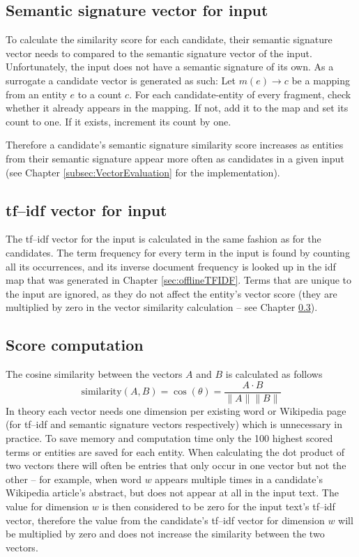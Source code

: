 \documentclass[runningheads,a4paper]{llncs}
\begin{document}
{\subsection{Semantic signature vector for input}\label{subsection:semSigVector}
To calculate the similarity score for each candidate, their semantic signature vector needs to compared to the semantic signature vector of the input. Unfortunately, the input does not have a semantic signature of its own. As a surrogate a candidate vector is generated as such: Let $m(e) \rightarrow c$ be a mapping from an entity $e$ to a count $c$. For each candidate-entity of every fragment, check whether it already appears in the mapping. If not, add it to the map and set its count to one. If it exists, increment its count by one.

Therefore a candidate's semantic signature similarity score increases as entities from their semantic signature appear more often as candidates in a given input (see Chapter \ref{subsec:VectorEvaluation} for the implementation).

\subsection{tf--idf vector for input}\label{subsec:tfidfInput}
The tf--idf vector for the input is calculated in the same fashion as for the candidates. The term frequency for every term in the input is found by counting all its occurrences, and its inverse document frequency is looked up in the idf map that was generated in Chapter \ref{sec:offlineTFIDF}. Terms that are unique to the input are ignored, as they do not affect the entity's vector score (they are multiplied by zero in the vector similarity calculation -- see Chapter \ref{sec:score computation}).

\subsection{Score computation}\label{sec:score computation}
The cosine similarity between the vectors $A$ and $B$ is calculated as follows
$$\mathrm{similarity}(A, B) = \cos(\theta) = \frac{A \cdot B}{\|A\| \|B\|}$$
In theory each vector needs one dimension per existing word or Wikipedia page (for tf--idf and semantic signature vectors respectively) which is unnecessary in practice. To save memory and computation time only the 100 highest scored terms or entities are saved for each entity. When calculating the dot product of two vectors there will often be entries that only occur in one vector but not the other -- for example, when word $w$ appears multiple times in a candidate's Wikipedia article's abstract, but does not appear at all in the input text. The value for dimension $w$ is then considered to be zero for the input text's tf--idf vector, therefore the value from the candidate's tf--idf vector for dimension $w$ will be multiplied by zero and does not increase the similarity between the two vectors.

}
\end{document}

